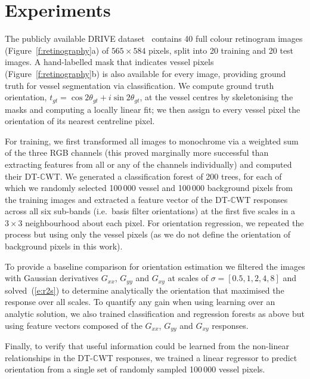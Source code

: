 \documentclass[runningheads,a4paper]{llncs}
\newcommand{\fref}[1]{Figure~\ref{#1}}
\newcommand{\eref}[1]{(\ref{#1})}
\def\Gxx{G_{xx}}
\def\Gxy{G_{xy}} \def\Gyx{G_{yx}}
\def\Gyy{G_{yy}}
\def\dtcwt{DT-$\mathbb{C}$WT}
\def\ie{i.e.}
\newcommand{\comment}[1]{}
\begin{document}
\section{Experiments}
\label{s:expts}
The publicly available DRIVE dataset~\cite{Staal_etal_TMI04} contains 40 full colour retinogram images (\fref{f:retinography}a) of $565{\times}584$ pixels, split into 20 training and 20 test images. A hand-labelled mask that indicates vessel pixels (\fref{f:retinography}b) is also available for every image, providing ground truth for vessel segmentation via classification. We compute ground truth orientation, $t_{gt} = \cos 2\theta_{gt} + i\sin 2\theta_{gt}$, at the vessel centres by skeletonising the masks and computing a locally linear fit; we then assign to every vessel pixel the orientation of its nearest centreline pixel.
%
\comment{Why 200k points? Was this limit dictated by system requirements?}

For training, we first transformed all images to monochrome via a weighted sum of the three RGB channels (this proved marginally more successful than extracting features from all or any of the channels individually) and computed their \dtcwt{}. We generated a classification forest of 200 trees, for each of which we randomly selected 100\,000 vessel and 100\,000 background pixels from the training images and extracted a feature vector of the \dtcwt{}  responses across all six sub-bands (\ie~basis filter orientations) at the first five scales in a $3{\times}3$ neighbourhood about each pixel. For orientation regression, we repeated the process but using only the vessel pixels (as we do not define the orientation of background pixels in this work).

To provide a baseline comparison for orientation estimation we filtered the images with Gaussian derivatives $\Gxx$, $\Gyy$ and $\Gxy$ at scales of $\sigma{=}[0.5, 1, 2, 4, 8]$ and solved~\eref{e:r2s} to determine analytically the orientation that maximised the response over all scales. To quantify any gain when using learning over an analytic solution, we also trained classification and regression forests as above but using feature vectors composed of the $\Gxx$, $\Gyy$ and $\Gxy$ responses.

Finally, to verify that useful information could be learned from the non-linear relationships in the \dtcwt{} responses, we trained a linear regressor to predict orientation from a single set of randomly sampled 100\,000 vessel pixels.
\end{document}
